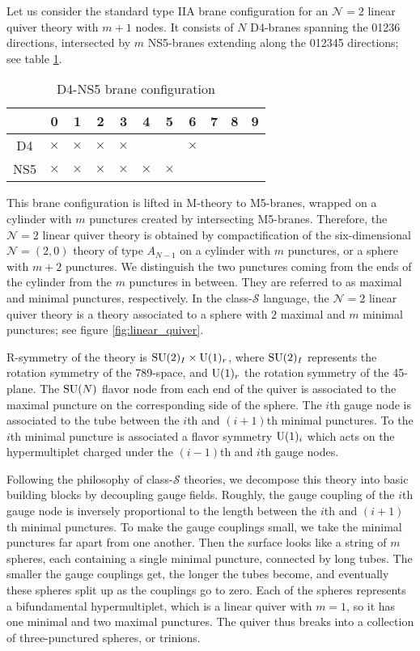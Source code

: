 Let us consider the standard type IIA brane configuration for an $\mathcal{N}=2$
linear quiver theory with $m+1$ nodes. It consists of $N$ D4-branes
spanning the 01236 directions, intersected by $m$ NS5-branes extending
along the 012345 directions; see table \ref{tab:D4NS5}.
\begin{table}
\caption{D4-NS5 brane configuration}
\label{tab:D4NS5}
\vspace{0.2cm}
  \centering
    \begin{tabular}{|c|c|c|c|c|c|c|c|c|c|c|}
\hline
  & 0 & 1 & 2 & 3 & 4 & 5 & 6 & 7 & 8 & 9\tabularnewline
\hline
D4       & $\times$ & $\times$ & $\times$ & $\times$ &    &    &    $\times$ & \phantom{X} & \phantom{X} &  \tabularnewline
\hline
NS5    & $\times$ & $\times$ & $\times$ & $\times$ & $\times$ & $\times$ &    &    &    &  \phantom{X}  \tabularnewline
\hline
    \end{tabular}
\end{table}
This brane configuration is lifted in M-theory to M5-branes, wrapped
on a cylinder with $m$ punctures created by intersecting M5-branes.
Therefore, the $\mathcal{N}=2$ linear quiver theory is obtained by
compactification of the six-dimensional $\mathcal{N}=( 2,0 )$ theory
of type $A_{N-1}$ on a cylinder with $m$ punctures, or a sphere
with $m+2$ punctures. We distinguish the two punctures coming from
the ends of the cylinder from the $m$ punctures in between. They
are referred to as maximal and minimal punctures, respectively. In
the class-$\mathcal{S}$ language, the $\mathcal{N}=2$ linear quiver
theory is a theory associated to a sphere with $2$ maximal and $m$
minimal punctures; see figure \ref{fig:linear_quiver}.

R-symmetry of the theory is $\mathrm{SU}(2)_{I} \times \mathrm{U}(1)_{r}$, where $\mathrm{SU}(2)_{I}$
represents the rotation symmetry of the 789-space, and $\mathrm{U}(1)_{r}$
the rotation symmetry of the 45-plane. The $\mathrm{SU}(N)$ flavor node from
each end of the quiver is associated to the maximal puncture on the
corresponding side of the sphere. The $i$th gauge node is associated
to the tube between the $i$th and $(i+1)$th minimal punctures. To
the $i$th minimal puncture is associated a flavor symmetry $\mathrm{U}(1)_{i}$
which acts on the hypermultiplet charged under the $(i-1)$th and
$i$th gauge nodes.

Following the philosophy of class-$\mathcal{S}$ theories, we decompose
this theory into basic building blocks by decoupling gauge fields.
Roughly, the gauge coupling of the $i$th gauge node is inversely
proportional to the length between the $i$th and $(i+1)$th minimal
punctures. To make the gauge couplings small, we take the minimal
punctures far apart from one another. Then the surface looks like
a string of $m$ spheres, each containing a single minimal puncture,
connected by long tubes. The smaller the gauge couplings get, the
longer the tubes become, and eventually these spheres split up as
the couplings go to zero. Each of the spheres represents a bifundamental
hypermultiplet, which is a linear quiver with $m=1$, so it has one
minimal and two maximal punctures. The quiver thus breaks into a collection
of three-punctured spheres, or trinions.


